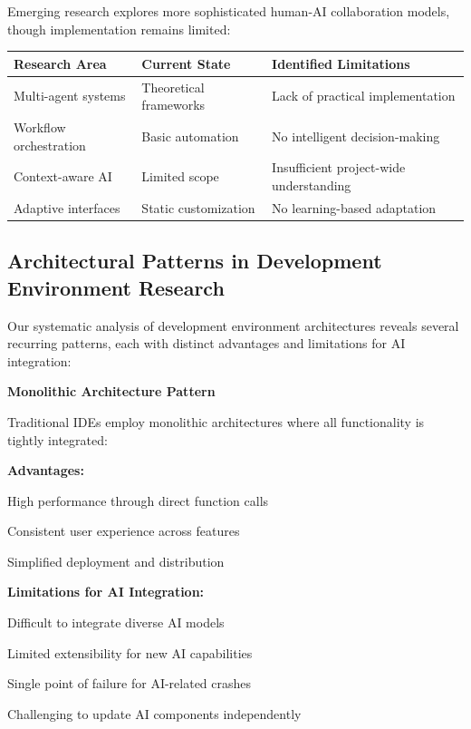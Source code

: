 Emerging research explores more sophisticated human-AI collaboration models, though implementation remains limited:

\begin{center}
\begin{tabular}{@{}lll@{}}
\toprule
\textbf{Research Area} & \textbf{Current State} & \textbf{Identified Limitations} \\
\midrule
Multi-agent systems & Theoretical frameworks & Lack of practical implementation \\
Workflow orchestration & Basic automation & No intelligent decision-making \\
Context-aware AI & Limited scope & Insufficient project-wide understanding \\
Adaptive interfaces & Static customization & No learning-based adaptation \\
\bottomrule
\end{tabular}
\label{tab:collaborative-ai-research}
\end{center}

\subsection{Architectural Patterns in Development Environment Research}
\label{subsec:architectural-patterns}

Our systematic analysis of development environment architectures reveals several recurring patterns, each with distinct advantages and limitations for AI integration:

\begin{successbox}
\textbf{Monolithic Architecture Pattern}

Traditional IDEs employ monolithic architectures where all functionality is tightly integrated:

\textbf{Advantages:}
\begin{compactlist}
    \item High performance through direct function calls
    \item Consistent user experience across features
    \item Simplified deployment and distribution
\end{compactlist}

\textbf{Limitations for AI Integration:}
\begin{compactlist}
    \item Difficult to integrate diverse AI models
    \item Limited extensibility for new AI capabilities
    \item Single point of failure for AI-related crashes
    \item Challenging to update AI components independently
\end{compactlist}
\end{successbox}


